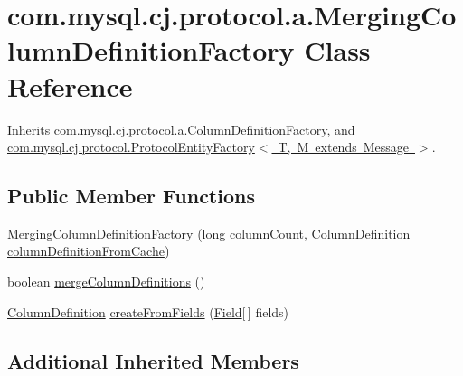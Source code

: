 \hypertarget{classcom_1_1mysql_1_1cj_1_1protocol_1_1a_1_1_merging_column_definition_factory}{}\section{com.\+mysql.\+cj.\+protocol.\+a.\+Merging\+Column\+Definition\+Factory Class Reference}
\label{classcom_1_1mysql_1_1cj_1_1protocol_1_1a_1_1_merging_column_definition_factory}


Inherits \mbox{\hyperlink{classcom_1_1mysql_1_1cj_1_1protocol_1_1a_1_1_column_definition_factory}{com.\+mysql.\+cj.\+protocol.\+a.\+Column\+Definition\+Factory}}, and \mbox{\hyperlink{interfacecom_1_1mysql_1_1cj_1_1protocol_1_1_protocol_entity_factory}{com.\+mysql.\+cj.\+protocol.\+Protocol\+Entity\+Factory$<$ T, M extends Message $>$}}.

\subsection*{Public Member Functions}
\begin{DoxyCompactItemize}
\item 
\mbox{\hyperlink{classcom_1_1mysql_1_1cj_1_1protocol_1_1a_1_1_merging_column_definition_factory_aaf619ede06b3b2f48c6d760419a04d9a}{Merging\+Column\+Definition\+Factory}} (long \mbox{\hyperlink{classcom_1_1mysql_1_1cj_1_1protocol_1_1a_1_1_column_definition_factory_ab70bfde683438b38a38429595659cd06}{column\+Count}}, \mbox{\hyperlink{interfacecom_1_1mysql_1_1cj_1_1protocol_1_1_column_definition}{Column\+Definition}} \mbox{\hyperlink{classcom_1_1mysql_1_1cj_1_1protocol_1_1a_1_1_column_definition_factory_ad0e12e85d3b3530e1e0775eae00255de}{column\+Definition\+From\+Cache}})
\item 
boolean \mbox{\hyperlink{classcom_1_1mysql_1_1cj_1_1protocol_1_1a_1_1_merging_column_definition_factory_ae2d954cccdfe76f992318754af511d61}{merge\+Column\+Definitions}} ()
\item 
\mbox{\hyperlink{interfacecom_1_1mysql_1_1cj_1_1protocol_1_1_column_definition}{Column\+Definition}} \mbox{\hyperlink{classcom_1_1mysql_1_1cj_1_1protocol_1_1a_1_1_merging_column_definition_factory_adf331127184c6503a1f3daed6948be05}{create\+From\+Fields}} (\mbox{\hyperlink{classcom_1_1mysql_1_1cj_1_1result_1_1_field}{Field}}\mbox{[}$\,$\mbox{]} fields)
\end{DoxyCompactItemize}
\subsection*{Additional Inherited Members}


